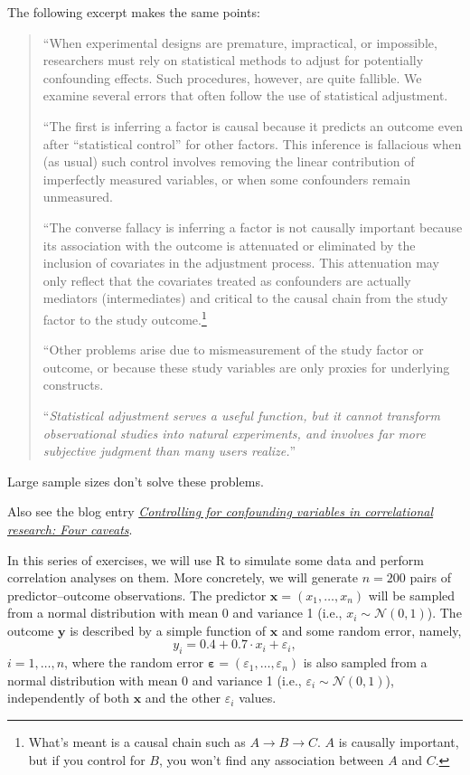 \documentclass[a4paper]{tufte-book}\usepackage[]{graphicx}\usepackage[]{xcolor}
\begin{document}
\medskip

The following excerpt makes the same points:
\begin{quote}
``When experimental designs are premature, impractical, or impossible,
researchers must rely on statistical methods to
adjust for potentially confounding effects.
Such procedures, however, are quite fallible.
We examine several errors that often follow the use of statistical adjustment.

``The first is inferring a factor is causal because
it predicts an outcome even after ``statistical control''
for other factors. This inference is fallacious when (as usual) such control
involves removing the linear contribution of
imperfectly measured variables, or when
some confounders remain unmeasured.

``The converse fallacy is inferring a factor is not causally
important because its association with the outcome is attenuated
or eliminated by the inclusion of covariates in the adjustment
process. This attenuation may only reflect that the covariates treated as
confounders are actually mediators (intermediates) and
critical to the causal chain from the study factor to the study
outcome.\footnote{What's meant is a causal chain such as $A \rightarrow B \rightarrow C$.
$A$ is causally important, but if you control for $B$, you won't find
any association between $A$ and $C$.}

``Other problems arise due to mismeasurement of the study factor or outcome,
or because these study variables are only proxies for underlying constructs.

``\emph{Statistical adjustment serves a useful
function, but it cannot transform observational studies into natural experiments, and involves far more subjective judgment than
many users realize.}''
\citep[abstract, my emphasis]{Christenfeld2004}
\end{quote}

\medskip

\begin{framed}
Large sample sizes don't solve these problems.
\end{framed}

\medskip
Also see the blog entry \href{https://janhove.github.io/posts/2015-08-24-caveats-confounds-correlational-designs/}{\textit{Controlling for confounding variables in correlational research: Four caveats}}.

In this series of exercises, we will use R to simulate some data
  and perform correlation analyses on them. More concretely, we will generate
  $n = 200$ pairs of predictor--outcome observations. The predictor $\bm x = (x_1, \dots, x_n)$
  will be sampled from a normal distribution with mean 0 and variance 1
  (i.e., $x_i \sim \mathcal{N}(0, 1)$).
  The outcome $\bm y$ is described by a simple function of $\bm x$ and some random error,
  namely,
  \[
    y_i = 0.4 + 0.7 \cdot x_i + \varepsilon_i,
  \]
  $i = 1, \dots, n$, where the random error $\bm \varepsilon = (\varepsilon_1, \dots, \varepsilon_n)$
  is also sampled from a normal distribution with mean 0 and variance 1
  (i.e., $\varepsilon_i \sim \mathcal{N}(0, 1)$),
  independently of both $\bm x$ and the other $\varepsilon_i$ values.
\end{document}
